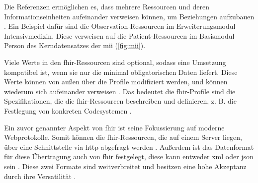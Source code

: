 Die Referenzen ermöglichen es, dass mehrere Ressourcen und deren Informationseinheiten aufeinander verweisen können, um Beziehungen aufzubauen \cite{fhir}. Ein Beispiel dafür sind die \glqq Observation\grqq{}-Ressourcen im Erweiterungsmodul \glqq Intensivmedizin\grqq{}. Diese verweisen auf die \glqq Patient\grqq{}-Ressourcen im Basismodul \glqq Person\grqq{} des Kerndatensatzes der \ac{mii} (\ref{fig:mii}).

Viele Werte in den \ac{fhir}-Ressourcen sind optional, sodass eine Umsetzung kompatibel ist, wenn sie nur die minimal obligatorischen Daten liefert. Diese Werte können von außen über die Profile modifiziert werden, und können wiederum sich aufeinander verweisen \cite{ehealtOk}. Das bedeutet die \ac{fhir}-Profile sind die Spezifikationen, die die \ac{fhir}-Ressourcen beschreiben und definieren, z. B. die Festlegung von konkreten Codesystemen \cite{fhir, fhircompact}.

Ein zuvor genannter Aspekt von \ac{fhir} ist seine Fokussierung auf moderne Webprotokolle. Somit können die \ac{fhir}-Ressourcen, die auf einem Server liegen, über eine Schnittstelle via \ac{http} abgefragt werden \cite{telemedizin, ehealtOk}. Außerdem ist das Datenformat für diese Übertragung auch von \ac{fhir} festgelegt, diese kann entweder \ac{xml} oder \ac{json} sein \cite{ehealtOk}. Diese zwei Formate sind weitverbreitet und besitzen eine hohe Akzeptanz durch ihre Versatilität \cite{fhirformat}.

